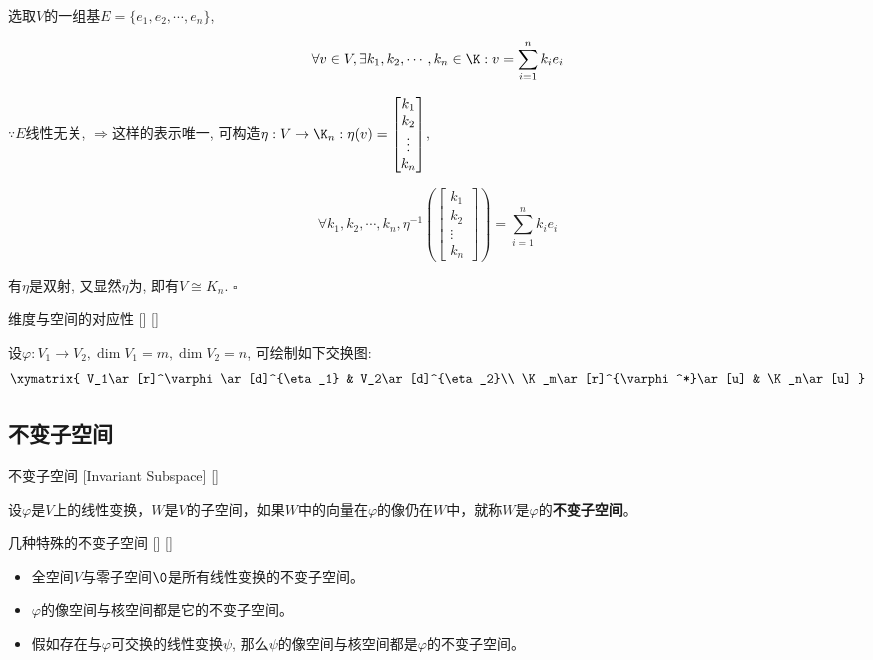 \documentclass[UTF8]{ctexart}
\begin{document}
		\begin{prf}
			选取$V$的一组基$E=\{e_1,e_2,\cdots,e_n\}$, 
			
			$$\forall v\in V, \exists k_1,k_2,\cdots,k_n\in\K:v=\sum_{i=1}^nk_ie_i$$
			
			$\because E$线性无关, $\Longrightarrow$这样的表示唯一, 可构造$\eta:V\to\K_n: \eta(v)=\begin{bmatrix}k_1\\k_2\\\vdots\\k_n\end{bmatrix}$, 
			
			$$\forall k_1,k_2,\cdots,k_n, \eta^{-1}(\begin{bmatrix}k_1\\k_2\\\vdots\\k_n\end{bmatrix})=\sum_{i=1}^nk_ie_i$$
			
			有$\eta$是双射, 又显然$\eta$为, 即有$V\cong K_n$. $\square$
		\end{prf}
  
		\begin{thm}
			[]
			{维度与空间的对应性}
			[]
			[]

			设$\varphi:V_1\to V_2, \dim V_1=m, \dim V_2=n$, 可绘制如下交换图: 
			$$\begin{matrix}
			\xymatrix{
			V_1\ar[r]^\varphi\ar[d]^{\eta_1} & V_2\ar[d]^{\eta_2}\\
			\K_m\ar[r]^{\varphi^*}\ar[u] & \K_n\ar[u]
			}
			\end{matrix}$$
		\end{thm}

	\subsection{不变子空间}
		\begin{dfn}
			[]
			{不变子空间}
			[Invariant Subspace]
			[]

			设$\varphi$是$V$上的线性变换，$W$是$V$的子空间，如果$W$中的向量在$\varphi$的像仍在$W$中，就称$W$是$\varphi$的\textbf{不变子空间}。
		\end{dfn}

		\begin{ppt}
			[]
			{几种特殊的不变子空间}
			[]
			[]

			\begin{itemize}
				\item 全空间$V$与零子空间$\0$是所有线性变换的不变子空间。
				\item $\varphi$的像空间与核空间都是它的不变子空间。
				\item 假如存在与$\varphi$可交换的线性变换$\psi$, 那么$\psi$的像空间与核空间都是$\varphi$的不变子空间。
			\end{itemize}
		\end{ppt}
	
\end{document}

